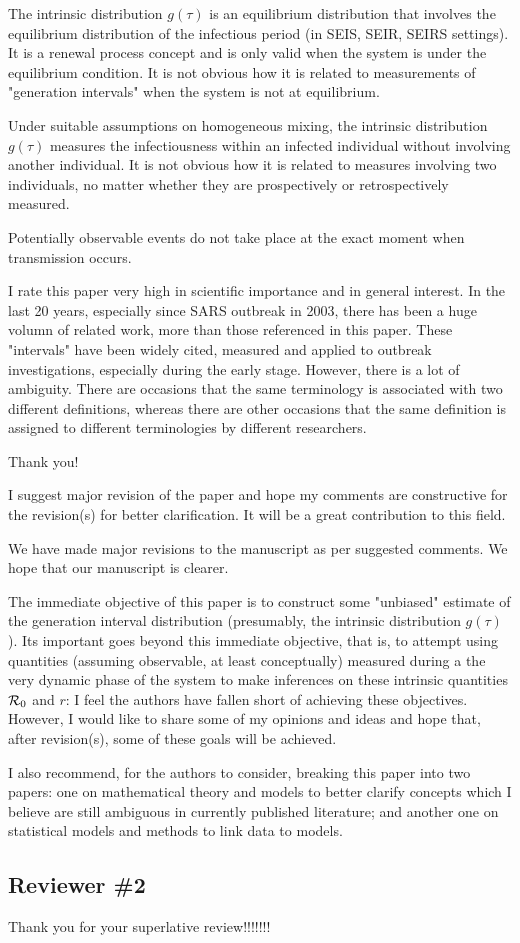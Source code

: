 \documentclass[12pt]{article}
\newcommand{\Rx}[1]{\ensuremath{{\cal R}_{#1}}}
\newcommand{\Ro}{\Rx{0}}
\newcommand{\reviewer}{\subsection*}
\newcommand{\revtext}{\textsf}
\begin{document}
\revtext{
The intrinsic distribution $g(\tau)$ is an equilibrium distribution that
involves the equilibrium distribution of the infectious period (in SEIS,
SEIR, SEIRS settings). It is a renewal process concept and is only
valid when the system is under the equilibrium condition. It is not
obvious how it is related to measurements of "generation intervals"
when the system is not at equilibrium.
}

\revtext{
 Under suitable assumptions on homogeneous mixing, the intrinsic
distribution $g(\tau)$ measures the infectiousness within an infected individual without involving another individual. It is not obvious how it
is related to measures involving two individuals, no matter whether
they are prospectively or retrospectively measured.
}

\revtext{
Potentially observable events do not take place at the exact moment
when transmission occurs.
}

\revtext{
I rate this paper very high in scientific importance and in general interest.
In the last 20 years, especially since SARS outbreak in 2003, there has
been a huge volumn of related work, more than those referenced in this
paper. These "intervals" have been widely cited, measured and applied to
outbreak investigations, especially during the early stage. However, there
is a lot of ambiguity. There are occasions that the same terminology is
associated with two different definitions, whereas there are other occasions
that the same definition is assigned to different terminologies by different
researchers.
}

Thank you!

\revtext{
I suggest major revision of the paper and hope my comments are
constructive for the revision(s) for better clarification. It will be a
great contribution to this field.
}

We have made major revisions to the manuscript as per suggested comments.
We hope that our manuscript is clearer.

\revtext{
The immediate objective of this paper is to construct some "unbiased" estimate of the generation interval distribution (presumably, the intrinsic distribution $g(\tau)$). Its important goes beyond this immediate objective, that is, to attempt using quantities (assuming observable, at least conceptually) measured during a the very dynamic
phase of the system to make inferences on these intrinsic quantities
$\Ro$ and $r$: I feel the authors have fallen short of achieving these objectives. However, I would like to share some of my opinions and ideas
and hope that, after revision(s), some of these goals will be achieved.
}

\revtext{
I also recommend, for the authors to consider, breaking this paper
into two papers: one on mathematical theory and models to better
clarify concepts which I believe are still ambiguous in currently published literature; and another one on statistical models and methods
to link data to models.
}

\reviewer{Reviewer \#2}

Thank you for your superlative review!!!!!!!


\end{document}
